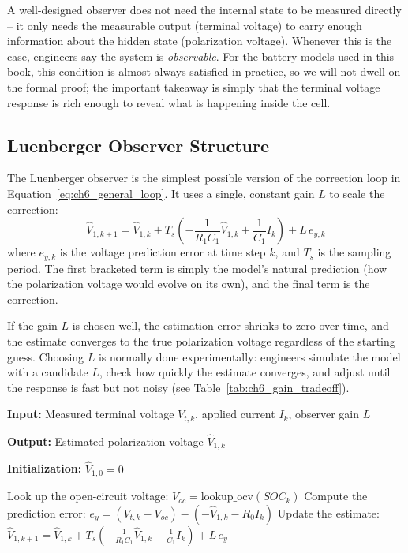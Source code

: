 A well-designed observer does not need the internal state to be measured directly -- it only needs the measurable output (terminal voltage) to carry enough information about the hidden state (polarization voltage). Whenever this is the case, engineers say the system is \emph{observable}. For the battery models used in this book, this condition is almost always satisfied in practice, so we will not dwell on the formal proof; the important takeaway is simply that the terminal voltage response is rich enough to reveal what is happening inside the cell.

\subsection{Luenberger Observer Structure}
The Luenberger observer is the simplest possible version of the correction loop in Equation~\eqref{eq:ch6_general_loop}. It uses a single, constant gain $L$ to scale the correction:
\begin{equation}
\hat{V}_{1,k+1} = \hat{V}_{1,k} + T_s \left( -\frac{1}{R_1 C_1}\hat{V}_{1,k} + \frac{1}{C_1}I_k \right) + L \, e_{y,k}
\label{eq:ch6_luenberger_def}
\end{equation}
where $e_{y,k}$ is the voltage prediction error at time step $k$, and $T_s$ is the sampling period. The first bracketed term is simply the model's natural prediction (how the polarization voltage would evolve on its own), and the final term is the correction.

If the gain $L$ is chosen well, the estimation error shrinks to zero over time, and the estimate converges to the true polarization voltage regardless of the starting guess. Choosing $L$ is normally done experimentally: engineers simulate the model with a candidate $L$, check how quickly the estimate converges, and adjust until the response is fast but not noisy (see Table~\ref{tab:ch6_gain_tradeoff}).

\begin{algorithm}[htbp]

\caption{Discrete Luenberger Observer for Polarization Voltage}
\label{alg:luenberger_observer}

\footnotesize

\begin{algorithmic}[1]

\State \textbf{Input:} Measured terminal voltage $V_{t,k}$, applied current $I_k$, observer gain $L$

\State \textbf{Output:} Estimated polarization voltage $\hat{V}_{1,k}$

\State \textbf{Initialization:} $\hat{V}_{1,0}=0$

    \State Look up the open-circuit voltage: $V_{oc} = \mathrm{lookup\_ocv}(SOC_k)$
    \State Compute the prediction error: $e_y = (V_{t,k}-V_{oc}) - (-\hat{V}_{1,k}-R_0I_k)$
    \State Update the estimate:
    \State $\hat{V}_{1,k+1} = \hat{V}_{1,k} + T_s\left(-\frac{1}{R_1C_1}\hat{V}_{1,k} + \frac{1}{C_1}I_k\right) + L\,e_y$
\EndFor

\end{algorithmic}

\end{algorithm}

